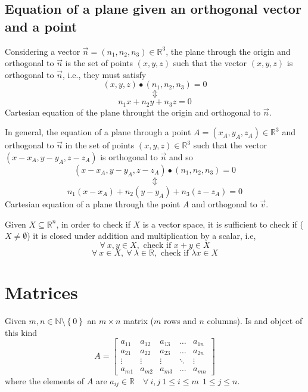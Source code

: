 \subsection{Equation of a plane given an orthogonal vector and a point}
Considering a vector $\vec n = (n_1,n_2,n_3) \in \mathbb{R}^3$, the plane through the origin and orthogonal to $\vec n$ is the set of points $(x,y,z)$ such that the vector $(x,y,z)$ is orthogonal to $\vec n$, i.e., they must satisfy
$$(x,y,z) \bullet \left(n_1, n_2, n_3\right) = 0$$
$$\Updownarrow$$
$$n_1x+n_2y+n_3z = 0$$
Cartesian equation of the plane throught the origin and orthogonal to $\vec n$.

In general, the equation of a plane through a point $A = (x_A, y_A, z_A) \in \mathbb{R}^3$ and orthogonal to $\vec n$ in the set of points $(x,y,z) \in \mathbb{R}^3$ such that the vector $(x-x_A, y-y_A, z-z_A)$ is orthogonal to $\vec n$ and so 
$$(x-x_A, y-y_A, z-z_A) \bullet(n_1,n_2,n_3) = 0 $$
$$\Updownarrow$$
$$n_1(x-x_A) + n_2(y-y_A) + n_3(z-z_A) = 0$$
Cartesian equation of a plane through the point $A$ and orthogonal to $\vec v$.

\begin{remark}[Remark]
    Given $X \subseteq \mathbb{R}^n$, in order to check if $X$ is a vector space, it is sufficient to check if ($X \not = \emptyset$) it is closed under addition and multiplication by a scalar, i.e,
    $$\forall \ x,y \in X, \text{ check if } x+y \in X$$
    $$\forall \ x \in X, \ \forall \ \lambda \in \mathbb{R}, \text{ check if } \lambda x \in X $$
\end{remark}
\section{Matrices}
Given $m, n \in \mathbb{N} \setminus \left\{ 0 \right\}$ an $m \times n$ matrix ($m$ rows and $n$ columns). Is and object of this kind
$$A = \begin{bmatrix}
    a_{11} &a_{12} &a_{13} &\dots &a_{1n}\\
    a_{21} &a_{22} &a_{23} &\dots &a_{2n}\\
    \vdots &\vdots &\vdots &\ddots &\vdots\\
    a_{m1} &a_{m2} &a_{m3} &\dots &a_{mn}
\end{bmatrix}$$
where the elements of $A$ are $a_{ij} \in \mathbb{R} \quad \forall\ i,j \ 1\le i \le m \ \ 1 \le j \le n$.

